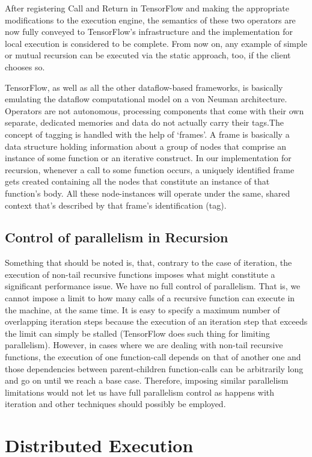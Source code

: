 \documentclass[ack,preface]{dithesis}
\begin{document}
After registering Call and Return in TensorFlow and making the appropriate modifications to the execution engine, the semantics of these two operators are now fully conveyed to TensorFlow's infrastructure and the implementation for local execution is considered to be complete. From now on, any example of simple or mutual recursion can be executed via the static approach, too, if the client chooses so.


TensorFlow, as well as all the other dataflow-based frameworks, is basically emulating the dataflow computational model on a von Neuman architecture. Operators are not autonomous, processing components that come with their own separate, dedicated memories and data do not actually carry their tags.The concept of tagging is handled with the help of \lq frames\rq .
A frame is basically a data structure holding information about a group of nodes that comprise an instance of some function or an iterative construct.
In our implementation for recursion, whenever a call to some function occurs, a uniquely identified frame gets created containing all the nodes that constitute an instance of that function's body. All these node-instances will operate under the same, shared context that's described by that frame's identification (tag).


    \subsection{Control of parallelism in Recursion}
Something that should be noted is, that, contrary to the case of iteration, the execution of non-tail recursive functions imposes what might constitute a significant performance issue.
We have no full control of parallelism. That is, we cannot impose a limit to how many calls of a recursive function can execute in the machine, at the same time.
Ιt is easy to specify a maximum number of overlapping iteration steps  because the execution of an iteration step that exceeds the limit can simply be stalled (TensorFlow does such thing for limiting parallelism). However, in cases where we are dealing with non-tail recursive functions, the execution of one function-call depends on that of another one and those dependencies between parent-children function-calls can be arbitrarily long and go on until we reach a base case. Therefore, imposing similar parallelism limitations would not let us have full parallelism control as happens with iteration and other techniques should possibly be employed.


    \section{Distributed Execution}
\end{document}
